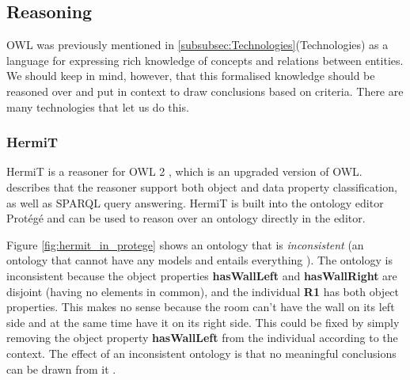 \documentclass{article}
\begin{document}
\subsection{Reasoning}\label{subsec:Reasoning}
OWL was previously mentioned in \ref{subsubsec:Technologies}(Technologies) as a language for expressing rich knowledge of concepts and relations between entities. We should keep in mind, however, that this formalised knowledge should be reasoned over and put in context to draw conclusions based on criteria. There are many technologies that let us do this.
\subsubsection{HermiT}
HermiT is a reasoner for OWL 2 \cite{glimm_hermit_2014}, which is an upgraded version of OWL. \citeauthor{glimm_hermit_2014} describes that the reasoner support both object and data property classification, as well as SPARQL query answering. HermiT is built into the ontology editor Protégé and can be used to reason over an ontology directly in the editor. 

Figure \ref{fig:hermit_in_protege} shows an ontology that is \emph{inconsistent} (an ontology that cannot have any models and entails everything \cite{horridge_explaining_2009, huang_reasoning_2004}). The ontology is inconsistent because the object properties \textbf{hasWallLeft} and \textbf{hasWallRight} are disjoint (having no elements in common), and the individual \textbf{R1} has both object properties. This makes no sense because the room can't have the wall on its left side and at the same time have it on its right side. This could be fixed by simply removing the object property \textbf{hasWallLeft} from the individual according to the context. The effect of an inconsistent ontology is that no meaningful conclusions can be drawn from it \cite{horridge_explaining_2009}.
\end{document}
